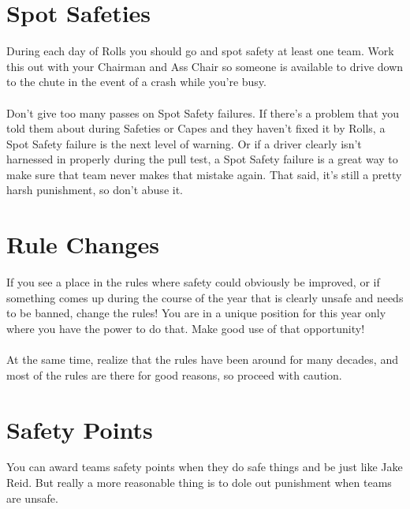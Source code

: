 \section{Spot Safeties}
\label{sec:Spot Safeties}
During each day of Rolls you should go and spot safety at least one team.
Work this out with your Chairman and Ass Chair so someone is available to
drive down to the chute in the event of a crash while you're busy.
\\\\
Don't give too many passes on Spot Safety failures. If there's a
problem that you told them about during Safeties or Capes and they haven't
fixed it by Rolls, a Spot Safety failure is the next level of warning. Or if
a driver clearly isn't harnessed in properly during the pull test, a Spot
Safety failure is a great way to make sure that team never makes that mistake
again. That said, it's still a pretty harsh punishment, so don't abuse it.

\section{Rule Changes}
If you see a place in the rules where safety could obviously be improved,
or if something comes up during the course of the year that is clearly
unsafe and needs to be banned, change the rules! You are in a unique
position for this year only where you have the power to do that. Make good
use of that opportunity!
\\\\
At the same time, realize that the rules have been around for many decades,
and most of the rules are there for good reasons, so proceed with caution.

\section{Safety Points}
\label{sec:Safety Points}
You can award teams safety points when they do safe things and be just like
Jake Reid. But really a more reasonable thing is to dole out punishment when
teams are unsafe.
